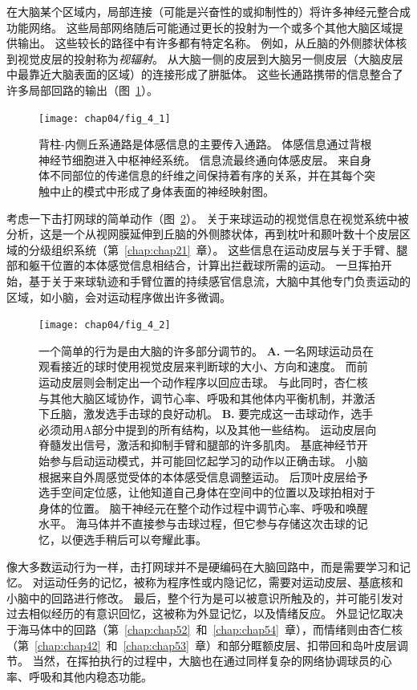 在大脑某个区域内，局部连接（可能是兴奋性的或抑制性的）将许多神经元整合成功能网络。
这些局部网络随后可能通过更长的投射为一个或多个其他大脑区域提供输出。
这些较长的路径中有许多都有特定名称。
例如，从丘脑的外侧膝状体核到视觉皮层的投射称为\textit{视辐射}。
从大脑一侧的皮层到大脑另一侧皮层（大脑皮层中最靠近大脑表面的区域）的连接形成了胼胝体。
这些长通路携带的信息整合了许多局部回路的输出（图~\ref{fig:4_1}）。


\begin{figure}[htbp]
	\centering
	\texttt{[image: chap04/fig\_4\_1]}
	\caption{背柱-内侧丘系通路是体感信息的主要传入通路。 
		体感信息通过背根神经节细胞进入中枢神经系统。 
		信息流最终通向体感皮层。 
		来自身体不同部位的传递信息的纤维之间保持着有序的关系，并在其每个突触中止的模式中形成了身体表面的神经映射图。}
	\label{fig:4_1}
\end{figure}


考虑一下击打网球的简单动作（图~\ref{fig:4_2}）。 
关于来球运动的视觉信息在视觉系统中被分析，这是一个从视网膜延伸到丘脑的外侧膝状体，再到枕叶和颞叶数十个皮层区域的分级组织系统（第~\ref{chap:chap21}~章）。
这些信息在运动皮层与关于手臂、腿部和躯干位置的本体感觉信息相结合，计算出拦截球所需的运动。 
一旦挥拍开始，基于关于来球轨迹和手臂位置的持续感官信息流，大脑中其他专门负责运动的区域，如小脑，会对运动程序做出许多微调。


\begin{figure}[htbp]
	\centering
	\texttt{[image: chap04/fig\_4\_2]}
	\caption{一个简单的行为是由大脑的许多部分调节的。 
		\textbf{A.} 一名网球运动员在观看接近的球时使用视觉皮层来判断球的大小、方向和速度。 
		而前运动皮层则会制定出一个动作程序以回应击球。
		与此同时，杏仁核与其他大脑区域协作，调节心率、呼吸和其他体内平衡机制，并激活下丘脑，激发选手击球的良好动机。 
		\textbf{B.} 要完成这一击球动作，选手必须动用A部分中提到的所有结构，以及其他一些结构。
		运动皮层向脊髓发出信号，激活和抑制手臂和腿部的许多肌肉。
		基底神经节开始参与启动运动模式，并可能回忆起学习的动作以正确击球。
		小脑根据来自外周感觉受体的本体感受信息调整运动。
		后顶叶皮层给予选手空间定位感，让他知道自己身体在空间中的位置以及球拍相对于身体的位置。
		脑干神经元在整个动作过程中调节心率、呼吸和唤醒水平。
		海马体并不直接参与击球过程，但它参与存储这次击球的记忆，以便选手稍后可以夸耀此事。}
	\label{fig:4_2}
\end{figure}


像大多数运动行为一样，击打网球并不是硬编码在大脑回路中，而是需要学习和记忆。
对运动任务的记忆，被称为程序性或内隐记忆，需要对运动皮层、基底核和小脑中的回路进行修改。
最后，整个行为是可以被意识所触及的，并可能引发对过去相似经历的有意识回忆，这被称为外显记忆，以及情绪反应。 
外显记忆取决于海马体中的回路（第~\ref{chap:chap52}~和~\ref{chap:chap54}~章），而情绪则由杏仁核（第~\ref{chap:chap42}~和~\ref{chap:chap53}~章）和部分眶额皮层、扣带回和岛叶皮层调节。
当然，在挥拍执行的过程中，大脑也在通过同样复杂的网络协调球员的心率、呼吸和其他内稳态功能。



